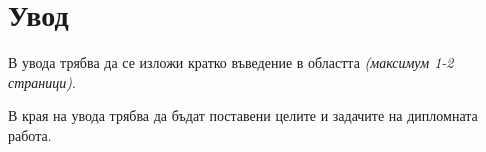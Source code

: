 \chapter*{Увод}

В увода трябва да се изложи кратко въведение в областта \emph{(максимум 1-2 страници)}.

В края на увода трябва да бъдат поставени целите и задачите на дипломната работа.
